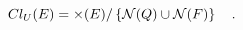 \begin{equation}
Cl_U (E) = \times (E) / \left \{ {\cal{N}} (Q) \cup {\cal{N}} (F)  
	\right\} \quad .
\label{eq:clu}
\end{equation}

